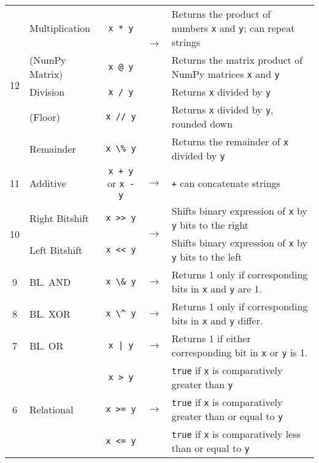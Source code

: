 \documentclass{article}
\begin{document}
\begin{center}
\begin{tabularx}{\textwidth}{clccX}
  \multirow{5}{*}{12} & Multiplication & \lstinline|x * y| & \multirow{2}{*}{\(\to\)} & Returns the product of numbers \lstinline|x| and \lstinline|y|; can repeat strings\\
                      & (NumPy Matrix) & \lstinline|x @ y| & & Returns the matrix product of NumPy matrices \lstinline|x| and \lstinline|y|\\
                      & Division & \lstinline|x / y| & & Returns \lstinline|x| divided by \lstinline|y|\\
                      & (Floor) & \lstinline|x // y| & & Returns \lstinline|x| divided by \lstinline|y|, rounded down\\
                      & Remainder & \lstinline|x \% y| & & Returns the remainder of \lstinline|x| divided by \lstinline|y|\\\midrule
                   11 & Additive & \lstinline|x + y| or \lstinline|x - y| & \(\to\) & \lstinline|+| can concatenate strings\\\midrule
  \multirow{2}{*}{10} & Right Bitshift & \lstinline|x >> y| & \multirow{2}{*}{\(\to\)} & Shifts binary expression of \lstinline|x| by \lstinline|y| bits to the right\\
                      & Left Bitshift & \lstinline|x << y| & & Shifts binary expression of \lstinline|x| by \lstinline|y| bits to the left\\\midrule
                  9 & BL. AND           & \lstinline|x \& y|    & \(\to\) & Returns 1 only if corresponding bits in \lstinline|x| and \lstinline|y| are 1. \\\midrule
                  8 & BL. XOR           & \lstinline|x \^ y|    & \(\to\) & Returns 1 only if corresponding bits in \lstinline|x| and \lstinline|y| differ.\\\midrule
                  7 & BL. OR            & \lstinline+x | y+     & \(\to\) & Returns 1 if either corresponding bit in \lstinline|x| or \lstinline|y| is 1.\\\midrule
\multirow{10}{*}{6} & \multirow{10}{*}{Relational} & \lstinline|x > y| & \multirow{10}{*}{\(\to\)} & \lstinline|true| if \lstinline|x| is comparatively greater than \lstinline|y| \\
& & \lstinline|x >= y| & & \lstinline|true| if \lstinline|x| is comparatively greater than or equal to \lstinline|y| \\
& & \lstinline|x <= y| & & \lstinline|true| if \lstinline|x| is comparatively less than or equal to \lstinline|y| \\

\end{tabularx}
\end{center}
\end{document}

